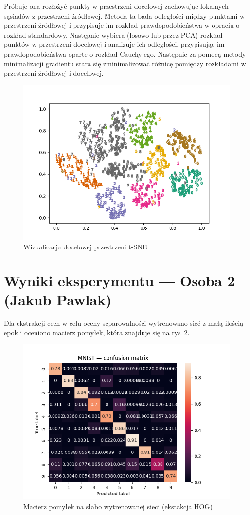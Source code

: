 \documentclass[10pt]{article}
\begin{document}
Próbuje ona rozłożyć punkty w przestrzeni docelowej zachowując lokalnych sąsiadów z przestrzeni źródłowej.
Metoda ta bada odległości między punktami w przestrzeni źródłowej i przypisuje im rozkład prawdopodobieństwa w opraciu o rozkład standardowy.
Następnie wybiera (losowo lub przez PCA) rozkład punktów w przestrzeni docelowej i analizuje ich odległości, przypisując im prawdopodobieństwa oparte o rozkład Cauchy'ego.
Następnie za pomocą metody minimalizacji gradientu stara się zminimalizować różnicę pomiędzy rozkładami w przestrzeni źródłowej i docelowej.

\begin{figure}[H]\centering
    \includegraphics[width=.6\linewidth]{img/tsne_embedding.png}
    \caption{Wizualicacja docelowej przestrzeni t-SNE}\label{fig:tsne-embed}
\end{figure}

\pagebreak

\section{Wyniki eksperymentu --- Osoba 2 (Jakub Pawlak)}

Dla ekstrakcji cech w celu oceny separowalności wytrenowano sieć z małą ilością epok i oceniono macierz pomyłek, która znajduje się na rys~\ref{fig:hog-bad-cm}.

\begin{figure}[H]\centering
    \includegraphics[width=.3\linewidth]{img/mnist_hog_bad_cm.png}
    \caption{Macierz pomyłek na słabo wytrenowanej sieci (ekstakcja HOG)}\label{fig:hog-bad-cm}
\end{figure}
\end{document}
